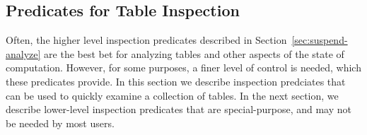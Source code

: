 \begin{description}

%
%


%

\end{description}


\subsection{Predicates for Table Inspection} \label{sec:table-inspection}
\label{sec:TablePred:Inspection}

Often, the higher level inspection predicates described in
Section~\ref{sec:suspend-analyze} are the best bet for analyzing
tables and other aspects of the state of computation.  However, for
some purposes, a finer level of control is needed, which these
predicates provide.  In this section we describe inspection predciates
that can be used to quickly examine a collection of tables.  In the
next section, we describe lower-level inspection predicates that are
special-purpose, and may not be needed by most users.

